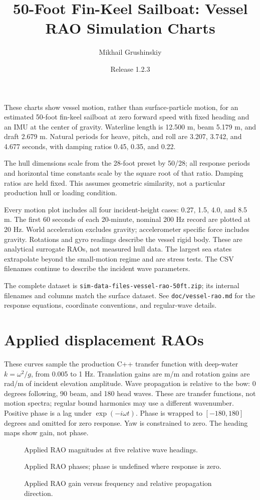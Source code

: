 \documentclass[11pt,letterpaper]{article}
\title{50-Foot Fin-Keel Sailboat: Vessel RAO Simulation Charts}
\author{Mikhail Grushinskiy}
\date{Release 1.2.3}
\newcommand{\VesselChart}[2]{
  \begin{figure}[H]\centering
  \resizebox{\textwidth}{!}{}
  \caption{#2}
  \end{figure}\clearpage
}
\begin{document}
\maketitle
These charts show vessel motion, rather than surface-particle motion, for an
estimated 50-foot fin-keel sailboat at zero forward speed with fixed heading
and an IMU at the center of gravity. Waterline length is 12.500 m, beam 5.179 m,
and draft 2.679 m. Natural periods for heave, pitch, and roll are 3.207, 3.742,
and 4.677 seconds, with damping ratios 0.45, 0.35, and 0.22.

The hull dimensions scale from the 28-foot preset by 50/28; all response
periods and horizontal time constants scale by the square root of that ratio.
Damping ratios are held fixed. This assumes geometric similarity, not a
particular production hull or loading condition.

Every motion plot includes all four incident-height cases: 0.27, 1.5, 4.0, and 8.5 m.
The first 60 seconds of each 20-minute, nominal 200 Hz record are plotted at
20 Hz. World acceleration excludes gravity; accelerometer specific force
includes gravity. Rotations and gyro readings describe the vessel rigid body.
These are analytical surrogate RAOs, not measured hull data. The largest sea
states extrapolate beyond the small-motion regime and are stress tests.
The CSV filenames continue to describe the incident wave parameters.

The complete dataset is \texttt{sim-data-files-vessel-rao-50ft.zip}; its internal
filenames and columns match the surface dataset. See \texttt{doc/vessel-rao.md}
for the response equations, coordinate conventions, and regular-wave details.
\clearpage
\section{Applied displacement RAOs}
These curves sample the production C++ transfer function with deep-water
$k=\omega^2/g$, from 0.005 to 1 Hz. Translation gains are m/m and rotation
gains are rad/m of incident elevation amplitude. Wave propagation is relative
to the bow: 0 degrees following, 90 beam, and 180 head waves. These are
transfer functions, not motion spectra; regular bound harmonics may use a
different wavenumber. Positive phase is a lag under $\exp(-i\omega t)$.
Phase is wrapped to $[-180,180]$ degrees and omitted for zero response.
Yaw is constrained to zero. The heading maps show gain, not phase.
\VesselChart{response_gain}{Applied RAO magnitudes at five relative wave headings.}
\VesselChart{response_phase}{Applied RAO phases; phase is undefined where response is zero.}
\VesselChart{response_heading}{Applied RAO gain versus frequency and relative propagation direction.}
\end{document}
